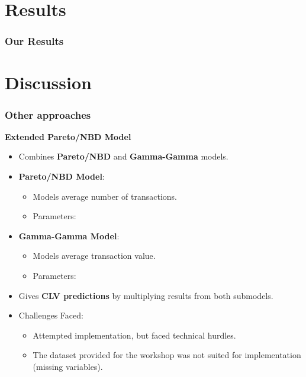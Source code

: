 \documentclass[aspectratio=169,xcolor=x11names,compress]{beamer}
\begin{document}
\section{Results}

\begin{frame}
\frametitle{Our Results}
\end{frame}

\section{Discussion}

\begin{frame}
\frametitle{Other approaches}

\textbf{Extended Pareto/NBD Model}

\begin{itemize}
  \item Combines \textbf{Pareto/NBD} and \textbf{Gamma-Gamma} models.
  
  \item \textbf{Pareto/NBD Model}:
  \begin{itemize}
    \item Models average number of transactions.
    \item Parameters: 
  \end{itemize}
  
  \item \textbf{Gamma-Gamma Model}:
  \begin{itemize}
    \item Models average transaction value.
    \item Parameters: 
  \end{itemize}
  
  \item Gives \textbf{CLV predictions} by multiplying results from both submodels.
  
  \item Challenges Faced:
  \begin{itemize}
    \item Attempted implementation, but faced technical hurdles.
    \item The dataset provided for the workshop was not suited for implementation (missing variables).
  \end{itemize}
\end{itemize}

\end{frame}
\end{document}
